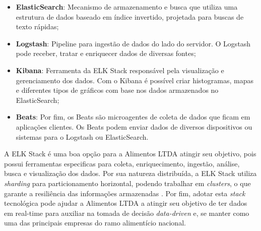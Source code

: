 \begin{itemize}
    \item \textbf{ElasticSearch}: Mecanismo de armazenamento e busca que utiliza uma estrutura de dados baseado em índice invertido, projetada para buscas de texto rápidas;
    
    \item \textbf{Logstash}: Pipeline para ingestão de dados do lado do servidor. O Logstash pode receber, tratar e enriquecer dados de diversas fontes;
    
    \item \textbf{Kibana}: Ferramenta da ELK Stack responsável pela visualização e gerenciamento dos dados. Com o Kibana é possível criar histogramas, mapas e diferentes tipos de gráficos com base nos dados armazenados no ElasticSearch;
    
    \item \textbf{Beats}: Por fim, os Beats são microagentes de coleta de dados que ficam em aplicações clientes. Os Beats podem enviar dados de diversos dispositivos ou sistemas para o Logstash ou ElasticSearch.
    
\end{itemize}


A ELK Stack é uma boa opção para a Alimentos LTDA atingir seu objetivo, pois possui ferramentas especificas para coleta, enriquecimento, ingestão, análise, busca e visualização dos dados. Por sua natureza distribuída, a ELK Stack utiliza \textit{sharding} para particionamento horizontal, podendo trabalhar em \textit{clusters}, o que garante a resiliência das informações armazenadas \cite{kononenko2014mining}. Por fim, adotar esta \textit{stack} tecnológica pode ajudar a Alimentos LTDA a atingir seu objetivo de ter dados em real-time para auxiliar na tomada de decisão \textit{data-driven} e, se manter como uma das principais empresas do ramo alimentício nacional.
